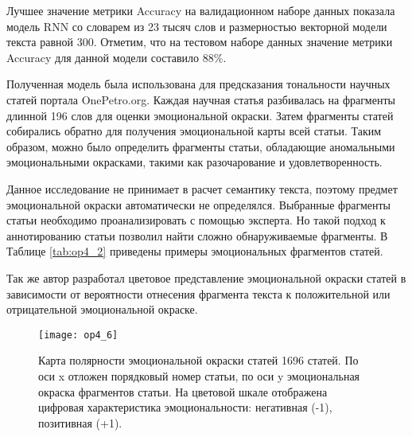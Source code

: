 Лучшее значение метрики Accuracy на валидационном наборе данных показала модель RNN со словарем из 23 тысяч слов и размерностью векторной модели текста равной 300. Отметим, что на тестовом наборе данных значение метрики Accuracy для данной модели составило 88\%.

Полученная модель была использована для предсказания тональности научных статей портала OnePetro.org.  Каждая научная статья разбивалась на фрагменты длинной 196 слов для оценки эмоциональной окраски. Затем фрагменты статей собирались обратно для получения эмоциональной карты всей статьи. Таким образом, можно было определить фрагменты статьи, обладающие аномальными эмоциональными окрасками, такими как разочарование и удовлетворенность. 

Данное исследование не принимает в расчет семантику текста, поэтому предмет эмоциональной окраски автоматически не определялся. Выбранные фрагменты статьи необходимо проанализировать с помощью эксперта. Но такой подход к аннотированию статьи позволил найти сложно обнаруживаемые фрагменты. В Таблице \ref{tab:op4_2} приведены примеры эмоциональных фрагментов статей.

\begin{table}[H]
\centering
\caption{Выявленные эмоциональные фрагменты статей.}
\label{tab:op4_2}
\end{table}

Так же автор разработал цветовое представление эмоциональной окраски статей в зависимости от вероятности отнесения фрагмента текста к положительной или отрицательной эмоциональной окраске.

\begin{figure}[H]
  \caption{Карта полярности эмоциональной окраски статей 1696 статей. По оси x отложен порядковый номер статьи, по оси y эмоциональная окраска фрагментов статьи. На цветовой шкале отображена цифровая характеристика эмоциональности: негативная (-1), позитивная (+1).}
  \centering
    \texttt{[image: op4\_6]}
  \label{fig:op4_6}
\end{figure}


